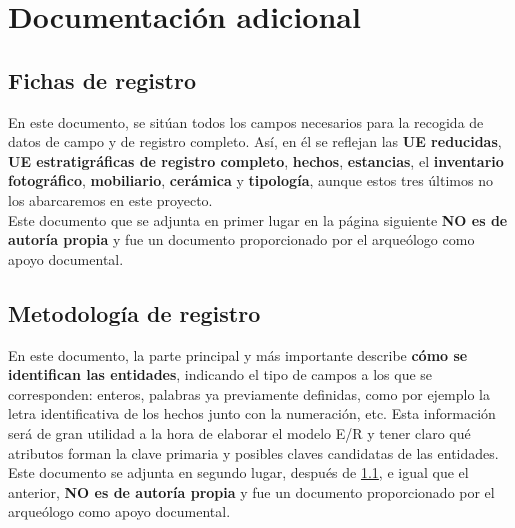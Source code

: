 \chapter{Documentación adicional}
\section{Fichas de registro} \label{sec:registrationforms}
En este documento, se sitúan todos los campos necesarios para la recogida de datos de campo
y de registro completo. Así, en él se reflejan las \textbf{UE reducidas}, \textbf{UE
estratigráficas de registro completo},  \textbf{hechos}, \textbf{estancias}, el
\textbf{inventario fotográfico}, \textbf{mobiliario}, \textbf{cerámica} y \textbf{tipología},
aunque estos tres últimos no los abarcaremos en este proyecto. \\

Este documento que se adjunta en primer lugar en la página siguiente \textbf{NO es de
autoría propia} y fue un documento proporcionado por el arqueólogo como apoyo documental.

\section{Metodología de registro}
En este documento, la parte principal y más importante describe \textbf{cómo se identifican
las entidades}, indicando el tipo de campos a los que se corresponden: enteros, palabras ya
previamente definidas, como por ejemplo la letra identificativa de los hechos junto con la
numeración, etc. Esta información será de gran utilidad a la hora de elaborar el modelo E/R
y tener claro qué atributos forman la clave primaria y posibles claves candidatas de las
entidades. \\

Este documento se adjunta en segundo lugar, después de \ref{sec:registrationforms}, e
igual que el anterior, \textbf{NO es de autoría propia} y fue un documento proporcionado por
el arqueólogo como apoyo documental.




